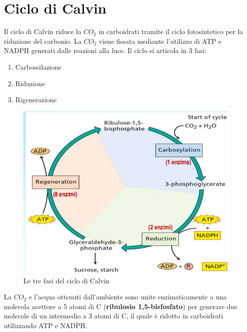 \documentclass[a4paper,12pt]{book}
\begin{document}
\section{Ciclo di Calvin}
Il ciclo di Calvin riduce la $CO_{2}$ in carboidrati tramite il ciclo fotosintetico per la riduzione del carbonio. La $CO_{2}$ viene fissata mediante l'utilizzo di ATP e NADPH generati dalle reazioni alla luce. Il ciclo si articola in 3 fasi:
\begin{enumerate}
\item{Carbossilazione}
\item{Riduzione}
\item{Rigenerazione}
\end{enumerate}

\begin{figure}[H]
\centering
\includegraphics[scale=0.4]{immagini/calvin.jpg}
\caption{Le tre fasi del ciclo di Calvin}
\end{figure}
La $CO_{2}$ e l'acqua ottenuti dall'ambiente sono unite enzimaticamente a una molecola acettore a 5 atomi di C (\textbf{ribulosio 1,5-bisfosfato}) per generare due molecole di un intermedio a 3 atomi di C, il quale è ridotto in carboidrati utilizzando ATP e NADPH.
\end{document}
